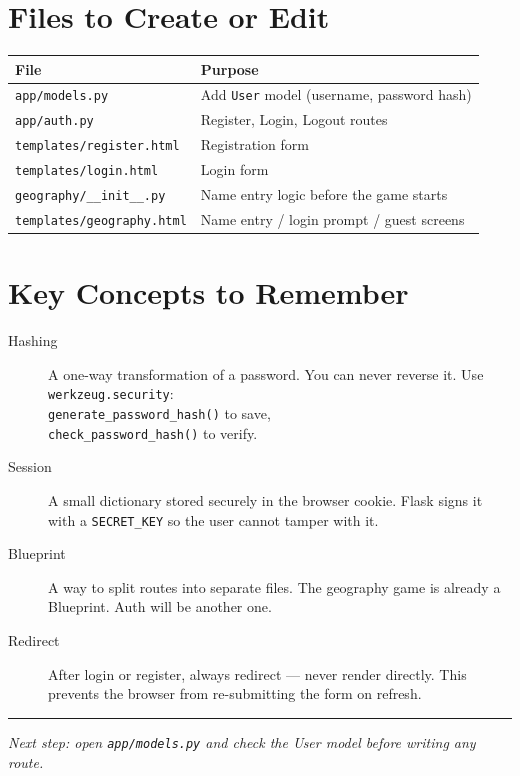 \documentclass[12pt, a4paper]{article}
\begin{document}
\section{Files to Create or Edit}

\begin{center}
\begin{tabular}{ll}
\toprule
\textbf{File} & \textbf{Purpose} \\
\midrule
\texttt{app/models.py}             & Add \texttt{User} model (username, password hash) \\
\texttt{app/auth.py}               & Register, Login, Logout routes \\
\texttt{templates/register.html}   & Registration form \\
\texttt{templates/login.html}      & Login form \\
\texttt{geography/\_\_init\_\_.py} & Name entry logic before the game starts \\
\texttt{templates/geography.html}  & Name entry / login prompt / guest screens \\
\bottomrule
\end{tabular}
\end{center}

\section{Key Concepts to Remember}

\begin{description}
    \item[Hashing] A one-way transformation of a password. You can never reverse it.
    Use \texttt{werkzeug.security}: \\
    \texttt{generate\_password\_hash()} to save, \\
    \texttt{check\_password\_hash()} to verify.

    \item[Session] A small dictionary stored securely in the browser cookie.
    Flask signs it with a \texttt{SECRET\_KEY} so the user cannot tamper with it.

    \item[Blueprint] A way to split routes into separate files.
    The geography game is already a Blueprint. Auth will be another one.

    \item[Redirect] After login or register, always redirect --- never render directly.
    This prevents the browser from re-submitting the form on refresh.
\end{description}

\vspace{2em}
\hrule
\vspace{0.5em}
{\small \textit{Next step: open \texttt{app/models.py} and check the User model before writing any route.}}
\end{document}
